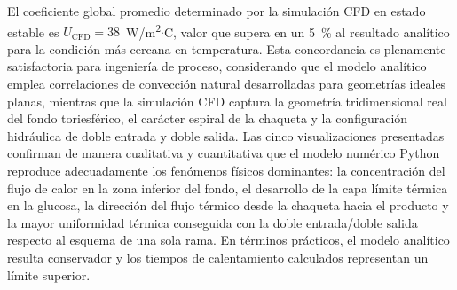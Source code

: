 El coeficiente global promedio determinado por la simulaci\'on CFD en estado estable es $U_{\text{CFD}} = 38$~W/m\textsuperscript{2}$\cdot$\textdegree C, valor que supera en un 5~\% al resultado anal\'itico para la condici\'on m\'as cercana en temperatura. Esta concordancia es plenamente satisfactoria para ingenier\'ia de proceso, considerando que el modelo anal\'itico emplea correlaciones de convecci\'on natural desarrolladas para geometr\'ias ideales planas, mientras que la simulaci\'on CFD captura la geometr\'ia tridimensional real del fondo toriesf\'erico, el car\'acter espiral de la chaqueta y la configuraci\'on hidr\'aulica de doble entrada y doble salida. Las cinco visualizaciones presentadas confirman de manera cualitativa y cuantitativa que el modelo num\'erico Python reproduce adecuadamente los fen\'omenos f\'isicos dominantes: la concentraci\'on del flujo de calor en la zona inferior del fondo, el desarrollo de la capa l\'imite t\'ermica en la glucosa, la direcci\'on del flujo t\'ermico desde la chaqueta hacia el producto y la mayor uniformidad t\'ermica conseguida con la doble entrada/doble salida respecto al esquema de una sola rama. En t\'erminos pr\'acticos, el modelo anal\'itico resulta conservador y los tiempos de calentamiento calculados representan un l\'imite superior.
